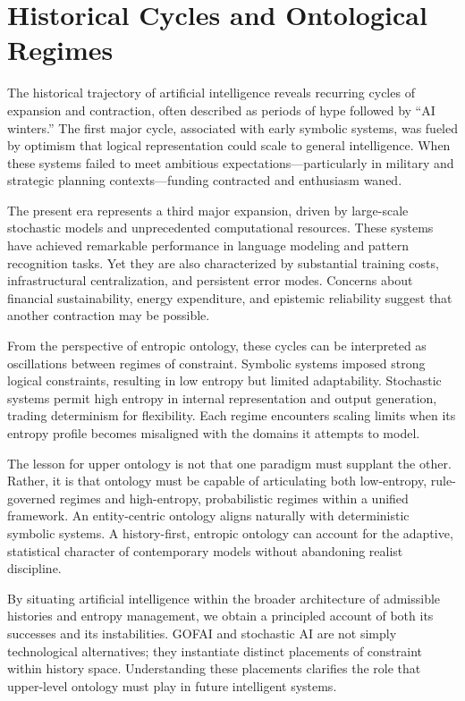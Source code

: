 \documentclass[12pt]{article}
\begin{document}
\section{Historical Cycles and Ontological Regimes}

The historical trajectory of artificial intelligence reveals recurring cycles of expansion and contraction, often described as periods of hype followed by ``AI winters.'' The first major cycle, associated with early symbolic systems, was fueled by optimism that logical representation could scale to general intelligence. When these systems failed to meet ambitious expectations—particularly in military and strategic planning contexts—funding contracted and enthusiasm waned.

The present era represents a third major expansion, driven by large-scale stochastic models and unprecedented computational resources. These systems have achieved remarkable performance in language modeling and pattern recognition tasks. Yet they are also characterized by substantial training costs, infrastructural centralization, and persistent error modes. Concerns about financial sustainability, energy expenditure, and epistemic reliability suggest that another contraction may be possible.

From the perspective of entropic ontology, these cycles can be interpreted as oscillations between regimes of constraint. Symbolic systems imposed strong logical constraints, resulting in low entropy but limited adaptability. Stochastic systems permit high entropy in internal representation and output generation, trading determinism for flexibility. Each regime encounters scaling limits when its entropy profile becomes misaligned with the domains it attempts to model.

The lesson for upper ontology is not that one paradigm must supplant the other. Rather, it is that ontology must be capable of articulating both low-entropy, rule-governed regimes and high-entropy, probabilistic regimes within a unified framework. An entity-centric ontology aligns naturally with deterministic symbolic systems. A history-first, entropic ontology can account for the adaptive, statistical character of contemporary models without abandoning realist discipline.

By situating artificial intelligence within the broader architecture of admissible histories and entropy management, we obtain a principled account of both its successes and its instabilities. GOFAI and stochastic AI are not simply technological alternatives; they instantiate distinct placements of constraint within history space. Understanding these placements clarifies the role that upper-level ontology must play in future intelligent systems.
\end{document}
